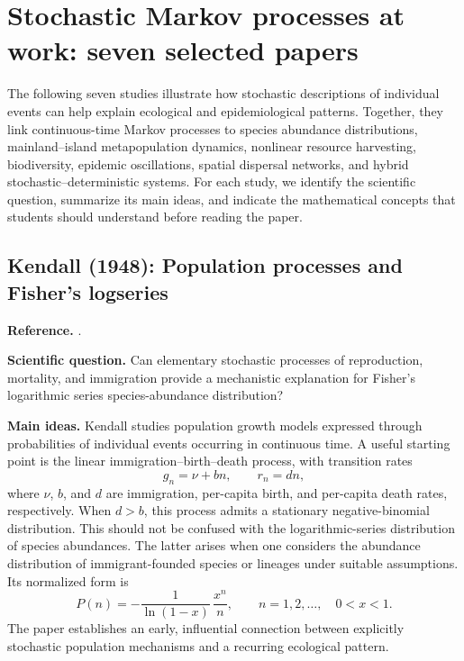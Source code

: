 \section{Stochastic Markov processes at work: seven selected papers}
\label{sec:seven-applications}

The following seven studies illustrate how stochastic descriptions of
individual events can help explain ecological and epidemiological patterns.
Together, they link continuous-time Markov processes to species
abundance distributions, mainland--island metapopulation dynamics,
nonlinear resource harvesting, biodiversity, epidemic oscillations,
spatial dispersal networks, and hybrid stochastic--deterministic systems. For each study, we identify the
scientific question, summarize its main ideas, and indicate the mathematical
concepts that students should understand before reading the paper.

\subsection{Kendall (1948): Population processes and Fisher's logseries}
\label{subsec:kendall}
\noindent\textbf{Reference.} \citet{Kendall1948Logseries}.

\medskip\noindent\textbf{Scientific question.}
Can elementary stochastic processes of reproduction, mortality, and
immigration provide a mechanistic explanation for Fisher's logarithmic series
species-abundance distribution?

\medskip\noindent\textbf{Main ideas.}
Kendall studies population growth models expressed through probabilities of
individual events occurring in continuous time. A useful starting point is the
linear immigration--birth--death process, with transition rates
\begin{equation}
  g_n=\nu+bn, \qquad r_n=dn,
\end{equation}
where $\nu$, $b$, and $d$ are immigration, per-capita birth, and per-capita
death rates, respectively. When $d>b$, this process admits a stationary
negative-binomial distribution. This should not be confused with the
logarithmic-series distribution of species abundances. The latter arises when
one considers the abundance distribution of immigrant-founded species or
lineages under suitable assumptions. Its normalized form is
\begin{equation}
  P(n)=-\frac{1}{\ln(1-x)}\,\frac{x^n}{n},
  \qquad n=1,2,\ldots,\quad 0<x<1.
\end{equation}
The paper establishes an early, influential connection between explicitly
stochastic population mechanisms and a recurring ecological pattern.


